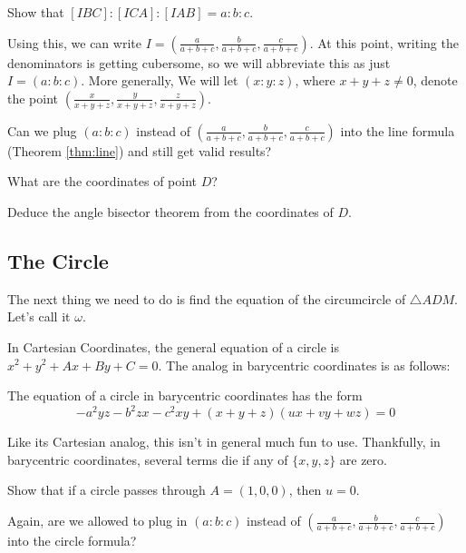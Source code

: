 \documentclass{scrartcl}
\begin{document}
\begin{ques*}
  Show that $[IBC] : [ICA] : [IAB] = a : b : c$.
\end{ques*}
Using this, we can write $I = \left( \frac{a}{a+b+c} , \frac{b}{a+b+c} , \frac{c}{a+b+c} \right)$.  At this point, writing the denominators is getting cubersome, so we will abbreviate this as just $I = (a : b: c)$.  More generally, We will let $(x : y : z)$, where $x+y+z \neq 0$, denote the point $\left( \frac{x}{x+y+z}, \frac{y}{x+y+z}, \frac{z}{x+y+z} \right)$.

\begin{ques*}
  Can we plug $(a : b : c)$ instead of $\left( \frac{a}{a+b+c}, \frac{b}{a+b+c}, \frac{c}{a+b+c} \right)$ into the line formula (Theorem \ref{thm:line}) and still get valid results?
\end{ques*}
\begin{ques*}
  What are the coordinates of point $D$?
\end{ques*}
\begin{ques*}
  Deduce the angle bisector theorem from the coordinates of $D$.
\end{ques*}


\subsection{The Circle}
The next thing we need to do is find the equation of the circumcircle of $\triangle ADM$.  Let's call it $\omega$.

In Cartesian Coordinates, the general equation of a circle is $x^2 + y^2 + Ax + By + C = 0$.  The analog in barycentric coordinates is as follows:
\begin{theorem}[Circle]
  The equation of a circle in barycentric coordinates has the form \[ -a^2yz - b^2zx - c^2xy + (x+y+z)(ux+vy+wz) = 0 \]
\end{theorem}
Like its Cartesian analog, this isn't in general much fun to use.  Thankfully, in barycentric coordinates, several terms die if any of $\{x,y,z\}$ are zero.

\begin{ques*}
  Show that if a circle passes through $A=(1,0,0)$, then $u=0$.
\end{ques*}
\begin{ques*}
  Again, are we allowed to plug in $(a:b:c)$ instead of $\left( \frac{a}{a+b+c} , \frac{b}{a+b+c} , \frac{c}{a+b+c} \right)$ into the circle formula?
\end{ques*}
\end{document}
